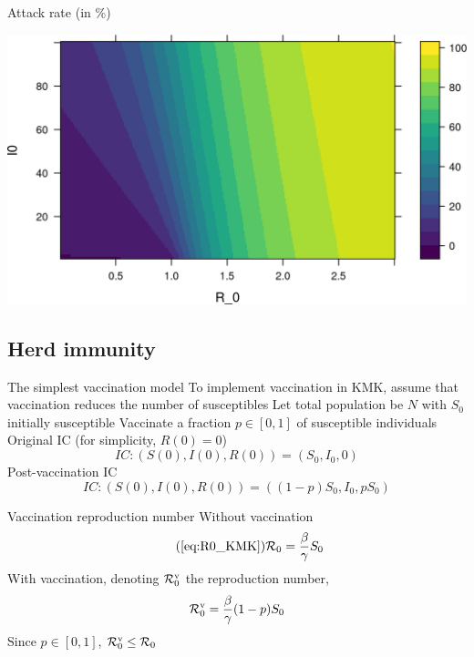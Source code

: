 \documentclass[aspectratio=43]{beamer}
\begin{document}
\begin{frame}{Attack rate (in \%)}
  \begin{center}
    \includegraphics[width=\textwidth]{../FIGS/KMK_taux_attaque}
  \end{center}
\end{frame}


\subsection{Herd immunity}

\begin{frame}{The simplest vaccination model}
To implement vaccination in KMK, assume that vaccination reduces the number of susceptibles
\vfill
Let total population be $N$ with $S_0$ initially susceptible
\vfill
Vaccinate a fraction $p\in[0,1]$ of susceptible individuals
\vfill
Original IC (for simplicity, $R(0)=0$)
\begin{equation}\label{eq:IC_KMK_novacc}
IC: (S(0),I(0),R(0)) = (S_0,I_0,0)
\end{equation}
Post-vaccination IC 
\begin{equation}\label{eq:IC_KMK_vacc}
IC: (S(0),I(0),R(0)) = ((1-p)S_0,I_0,pS_0)
\end{equation}
\end{frame}


\begin{frame}{Vaccination reproduction number}
  Without vaccination
  \begin{equation}\tag{\ref{eq:R0_KMK}}
    \R_0=\frac{\beta}{\gamma}S_0
  \end{equation}
  \vfill
  With vaccination, denoting $\mathcal{R}_0^{\text{v}}$ the reproduction number,
  \begin{equation}
    \mathcal{R}_0^{\text{v}} = \frac{\beta}{\gamma}(1-p)S_0
  \end{equation}
  \vfill
  Since $p\in[0,1]$, $\mathcal{R}_0^{\text{v}}\leq\mathcal{R}_0$
\end{frame}
\end{document}
